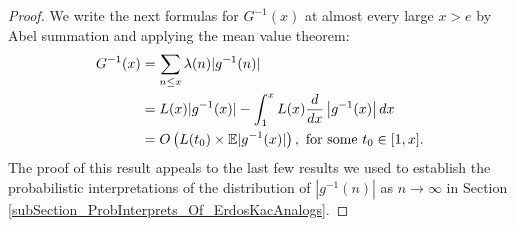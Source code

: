 \documentclass[11pt,reqno,a4letter]{article}
\numberwithin{figure}{section}
\numberwithin{table}{section}
\theoremstyle{plain}
\numberwithin{theorem}{section}
\theoremstyle{definition}
\begin{document}
\begin{proof} 
We write the next formulas for $G^{-1}(x)$ at almost every large $x > e$ 
by Abel summation and applying the mean value theorem: 
\begin{align} 
\notag 
G^{-1}(x) & = \sum_{n \leq x} \lambda(n) |g^{-1}(n)| \\ 
\notag
     & = L(x) |g^{-1}(x)| - \int_1^x L(x) \frac{d}{dx}\left\lvert g^{-1}(x) \right\rvert dx \\ 
\label{proof_tag_GInvx_LxAbelSummationIntFormula_v1} 
     & = O\left(L(t_0) \times \mathbb{E}|g^{-1}(x)|\right), \mathrm{\ for\ some\ } t_0 \in [1, x]. 
\end{align} 
The proof of this result appeals to the 
last few results we used to establish the 
probabilistic interpretations of the distribution of $|g^{-1}(n)|$ as 
$n \rightarrow \infty$ in 
Section \ref{subSection_ProbInterprets_Of_ErdosKacAnalogs}. 


\end{proof}
\end{document}
